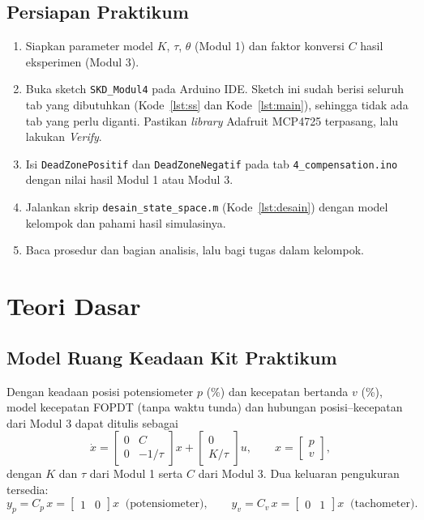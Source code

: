 \documentclass[11pt,a4paper]{article}
\newcommand{\prog}[1]{\texttt{#1}}
\begin{document}
\subsection{Persiapan Praktikum}
\begin{enumerate}
\item Siapkan parameter model $K$, $\tau$, $\theta$ (Modul 1) dan faktor konversi $C$ hasil eksperimen (Modul 3).
\item Buka sketch \prog{SKD\_Modul4} pada Arduino IDE. Sketch ini sudah berisi seluruh tab yang dibutuhkan (Kode~\ref{lst:ss} dan Kode~\ref{lst:main}), sehingga tidak ada tab yang perlu diganti. Pastikan \textit{library} Adafruit MCP4725 terpasang, lalu lakukan \textit{Verify}.
\item Isi \texttt{DeadZonePositif} dan \texttt{DeadZoneNegatif} pada tab \prog{4\_compensation.ino} dengan nilai hasil Modul 1 atau Modul 3.
\item Jalankan skrip \prog{desain\_state\_space.m} (Kode~\ref{lst:desain}) dengan model kelompok dan pahami hasil simulasinya.
\item Baca prosedur dan bagian analisis, lalu bagi tugas dalam kelompok.
\end{enumerate}

\section{Teori Dasar}
\subsection{Model Ruang Keadaan Kit Praktikum}
Dengan keadaan posisi potensiometer $p$ (\%) dan kecepatan bertanda $v$ (\%), model kecepatan FOPDT (tanpa waktu tunda) dan hubungan posisi--kecepatan dari Modul 3 dapat ditulis sebagai
\begin{equation}
\dot{x} =
\begin{bmatrix} 0 & C \\ 0 & -1/\tau \end{bmatrix} x +
\begin{bmatrix} 0 \\ K/\tau \end{bmatrix} u,
\qquad
x = \begin{bmatrix} p \\ v \end{bmatrix},
\label{eq:ss_kontinu}
\end{equation}
dengan $K$ dan $\tau$ dari Modul 1 serta $C$ dari Modul 3. Dua keluaran pengukuran tersedia:
\begin{equation}
y_p = C_p\,x = \begin{bmatrix} 1 & 0 \end{bmatrix} x \;\;\text{(potensiometer)},
\qquad
y_v = C_v\,x = \begin{bmatrix} 0 & 1 \end{bmatrix} x \;\;\text{(tachometer)}.
\label{eq:keluaran}
\end{equation}
\end{document}
